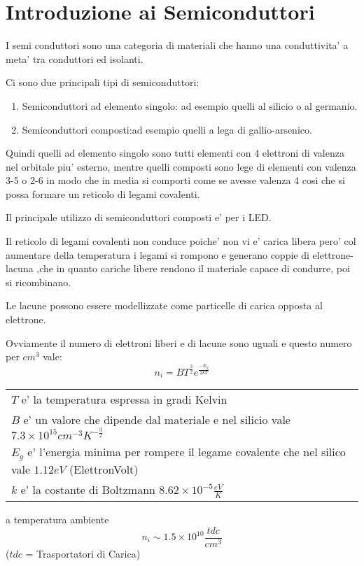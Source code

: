 \documentclass[\main/main.tex]{subfiles}
\begin{document}
\section{Introduzione ai Semiconduttori}
I semi conduttori sono una categoria di materiali che hanno una conduttivita' a meta' tra conduttori ed isolanti.

Ci sono due principali tipi di semiconduttori:
\begin{enumerate}
  \item Semiconduttori ad elemento singolo: ad esempio quelli al silicio o al germanio.
  \item Semiconduttori composti:ad esempio quelli a lega di gallio-arsenico.
\end{enumerate}
Quindi quelli ad elemento singolo sono tutti elementi con 4 elettroni di valenza nel orbitale piu' esterno, mentre quelli composti sono lege di elementi con valenza 3-5 o 2-6 in modo che in media si comporti come se avesse valenza 4 cosi che si possa formare un reticolo di legami covalenti.

Il principale utilizzo di semiconduttori composti e' per i LED.

Il reticolo di legami covalenti non conduce poiche' non vi e' carica libera pero' col aumentare della temperatura i legami si rompono e generano coppie di elettrone-lacuna ,che in quanto cariche libere rendono il materiale capace di condurre, poi si ricombinano.

Le lacune possono essere modellizzate come particelle di carica opposta al elettrone.

Ovviamente il numero di elettroni liberi e di lacune sono uguali e questo numero per $cm^3$ vale:
\[n_i = BT^{\frac{3}{2}}e^{\frac{-E_g}{2kT}}\]
\begin{tabular}{l}
  $T$ e' la temperatura espressa in gradi Kelvin                                                              \\
  $B$ e' un valore che dipende dal materiale e nel silicio vale $7.3 \times 10^{15} cm^{-3} K^{-\frac{3}{2}}$ \\
  $E_g$ e' l'energia minima per rompere il legame covalente che nel silico vale $1.12 eV$ (ElettronVolt)      \\
  $k$ e' la costante di Boltzmann $8.62 \times 10^{-5} \frac{eV}{K}$
\end{tabular}
a temperatura ambiente \[n_i \sim 1.5 \times 10^{10} \frac{tdc}{cm^3}\]
($tdc$ = Trasportatori di Carica)
\clearpage
\end{document}
